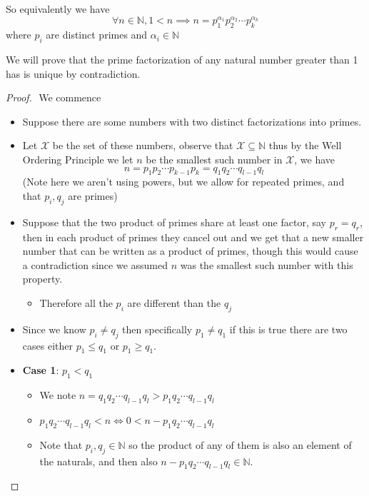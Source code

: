 \documentclass[11pt]{book}
\begin{document}
So equivalently we have 
\[
\forall n \in \mathbb{N} , 1 < n \implies n = p_{1} ^{\alpha _{1} } p_{2} ^{\alpha _{2} } \dotsm p_{k} ^{\alpha _{k} }  
\]
where $p_{i} $ are distinct primes and $\alpha _{i} \in \mathbb{N} $ 

We will prove that the prime factorization of any natural number greater than 1 has is unique by contradiction.

\newpage

\begin{proof}
$ $\newline
We commence
\begin{itemize}
    \item Suppose there are some numbers with two distinct factorizations into primes.
    \item Let $\mathcal{X} $ be the set of these numbers, observe that $\mathcal{X} \subseteq \mathbb{N} $ thus by the Well Ordering Principle we let $n$ be the smallest such number in $\mathcal{X} $, we have 
        \[
        n= p_1 p_2 \dotsb p_{k - 1} p_{k} = q_1 q_2 \dotsb q_{l - 1} q_{l}
        \]
        (Note here we aren't using powers, but we allow for repeated primes, and that $p_{i} ,q_{j} $ are primes)
    \item Suppose that the two product of primes share at least one factor, say $p_{r} = q_{r} $, then in each product of primes they cancel out and we get that a new smaller number that can be written as a product of primes, though this would cause a contradiction since we assumed $n$ was the smallest such number with this property. 
        \begin{itemize}
            \item Therefore all the $p_{i} $ are different than the $q_{j} $ 
        \end{itemize}
    \item Since we know $p_{i} \neq q_{j} $ then specifically $p_{1} \neq q_{1} $ if this is true there are two cases either $p_{1} \le q_{1} $ or $p_{1} \ge q_{1} $.
    \item \textbf{Case 1}: $p_{1} < q_{1} $ 
        \begin{itemize}
            \item We note $n = q_1 q_2 \dotsb q_{l - 1} q_{l} > p_1 q_2 \dotsb q_{l - 1} q_{l}$ 
            \item $p_1 q_2 \dotsb q_{l - 1} q_{l} < n \Leftrightarrow 0 < n - p_1 q_2 \dotsb q_{l - 1} q_{l}$ 
            \item Note that $p_{i} , q_{j} \in \mathbb{N} $ so the product of any of them is also an element of the naturals, and then also $n - p_1 q_2 \dotsb q_{l - 1} q_{l} \in \mathbb{N}$.

\end{itemize}
\end{itemize}
\end{proof}
\end{document}
